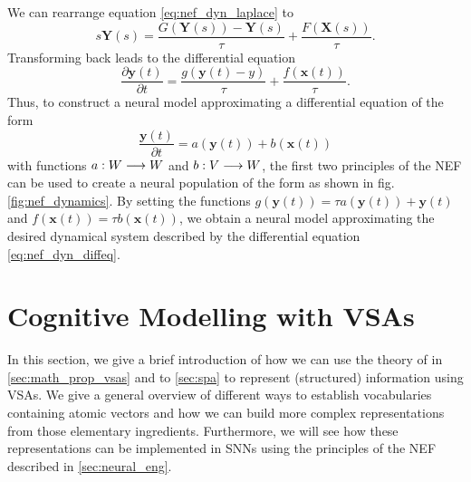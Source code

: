 We can rearrange equation \ref{eq:nef_dyn_laplace} to
\begin{equation}
s\mathbf{Y}(s) = \frac{G(\mathbf{Y}(s))-\mathbf{Y}(s)}{\tau} + \frac{F(\mathbf{X}(s))}{\tau}.
\end{equation}
Transforming back leads to the differential equation
\begin{equation}
\frac{\partial \mathbf{y}(t)}{\partial t} = \frac{g(\mathbf{y}(t)-y)}{\tau} + \frac{f(\mathbf{x}(t))}{\tau}.
\end{equation}
Thus, to construct a neural model approximating a differential equation of the form 
\begin{equation}
\frac{\mathbf{y}(t)}{\partial t} = a(\mathbf{y}(t)) + b(\mathbf{x}(t))
\label{eq:nef_dyn_diffeq}
\end{equation}
with functions $a: W \longrightarrow W$ and $b: V \longrightarrow W$, the first two principles of the \ac{NEF} can be used to create a neural population of the form as shown in fig. \ref{fig:nef_dynamics}.
By setting the functions $g(\mathbf{y}(t))=\tau a(\mathbf{y}(t)) + \mathbf{y}(t)$ and $f(\mathbf{x}(t))=\tau b(\mathbf{x}(t))$, we obtain a neural model approximating the desired dynamical system described by the differential equation \ref{eq:nef_dyn_diffeq}.


\section{Cognitive Modelling with \aclp{VSA}}
In this section, we give a brief introduction of how we can use the theory of in \ref{sec:math_prop_vsas} and to \ref{sec:spa} to represent (structured) information using \acp{VSA}.
We give a general overview of different ways to establish vocabularies containing atomic vectors and how we can build more complex representations from those elementary ingredients.
Furthermore, we will see how these representations can be implemented in \acp{SNN} using the principles of the \ac{NEF} described in \ref{sec:neural_eng}.
